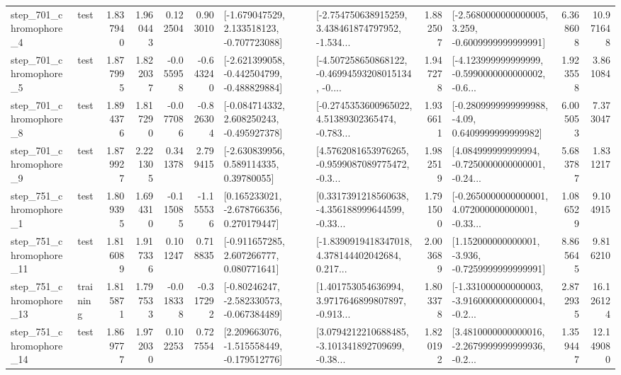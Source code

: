 \begin{tabular}{llrrrrllrlrr}
   step\_701\_chromophore\_4 &      test &      1.837940 &    1.960443 &      0.122504 &  0.903010 &   [-1.679047529, 2.133518123, -0.707723088] &  [-2.754750638915259, 3.438461874797952, -1.534... &       1.882507 &  [-2.5680000000000005, 3.259, -0.6009999999999991] &            6.368608 &         10.971648 \\
   step\_701\_chromophore\_5 &      test &      1.877995 &    1.822037 &     -0.055958 & -0.643240 &  [-2.621399058, -0.442504799, -0.488829884] &  [-4.507258650868122, -0.46994593208015134, -0.... &       1.947278 &  [-4.123999999999999, -0.5990000000000002, -0.6... &            1.923558 &          3.861084 \\
   step\_701\_chromophore\_8 &      test &      1.894376 &    1.817290 &     -0.077086 & -0.826304 &   [-0.084714332, 2.608250243, -0.495927378] &  [-0.2745353600965022, 4.51389302365474, -0.783... &       1.936611 &   [-0.2809999999999988, -4.09, 0.6409999999999982] &            6.005053 &          7.373047 \\
   step\_701\_chromophore\_9 &      test &      1.879927 &    2.221305 &      0.341378 &  2.799415 &     [-2.630839956, 0.589114335, 0.39780055] &  [4.5762081653976265, -0.9599087089775472, -0.3... &       1.982519 &  [4.084999999999994, -0.7250000000000001, -0.24... &            5.683787 &          1.831217 \\
   step\_751\_chromophore\_1 &      test &      1.809395 &    1.694310 &     -0.115085 & -1.155536 &    [0.165233021, -2.678766356, 0.270179447] &  [0.3317391218560638, -4.356188999644599, -0.33... &       1.791500 &  [-0.2650000000000001, 4.072000000000001, -0.33... &            1.086529 &          9.104915 \\
  step\_751\_chromophore\_11 &      test &      1.816089 &    1.917336 &      0.101247 &  0.718835 &    [-0.911657285, 2.607266777, 0.080771641] &  [-1.8390919418347018, 4.378144402042684, 0.217... &       2.003689 &   [1.152000000000001, -3.936, -0.7259999999999991] &            8.865645 &          9.816210 \\
  step\_751\_chromophore\_13 &  training &      1.815871 &    1.797533 &     -0.018338 & -0.317292 &   [-0.80246247, -2.582330573, -0.067384489] &  [1.401753054636994, 3.9717646899807897, -0.913... &       1.803378 &  [-1.331000000000003, -3.9160000000000004, -0.2... &            2.872935 &         16.126124 \\
  step\_751\_chromophore\_14 &      test &      1.869777 &    1.972030 &      0.102253 &  0.727554 &   [2.209663076, -1.515558449, -0.179512776] &  [3.0794212210688485, -3.101341892709699, -0.38... &       1.820192 &  [3.4810000000000016, -2.2679999999999936, -0.2... &            1.359447 &         12.149080 \\

\end{tabular}
